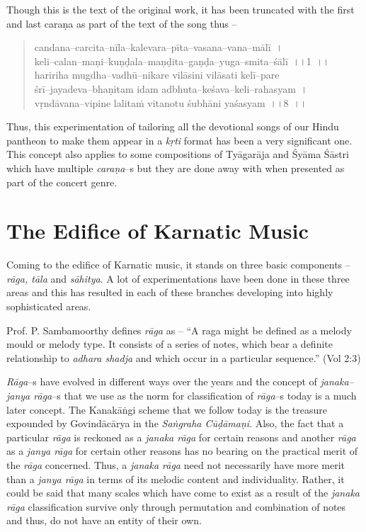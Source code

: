 Though this is the text of the original work, it has been truncated with the first and last caraṇa as part of the text of the song thus –

\begin{verse}
candana–carcita–nīla–kalevara–pīta–vasana–vana–mālī~।\\ keli–calan–maṇi–kuṇḍala–maṇḍita–gaṇḍa–yuga–smita–śālī~।।1~।।\\ haririha mugdha–vadhū–nikare vilāsini vilāsati kelī–pare\\ śrī–jayadeva–bhaṇitam idam adbhuta–keśava–keli–rahasyam~।\\ vṛndāvana–vipine lalitaṁ vitanotu śubhāni yaśasyam~।।8~।।
\end{verse}

Thus, this experimentation of tailoring all the devotional songs of our Hindu pantheon to make them appear in a \textit{kṛti} format has been a very significant one. This concept also applies to some compositions of Tyāgarāja and Śyāma Śāstri which have multiple \textit{caraṇa}–s but they are done away with when presented as part of the concert genre.


\section*{The Edifice of Karnatic Music}

Coming to the edifice of Karnatic music, it stands on three basic components – \textit{rāga, tāla} and \textit{sāhitya}. A lot of experimentations have been done in these three areas and this has resulted in each of these branches developing into highly sophisticated areas.

Prof. P. Sambamoorthy defines \textit{rāga} as – “A raga might be defined as a melody mould or melody type. It consists of a series of notes, which bear a definite relationship to \textit{adhara shadja} and which occur in a particular sequence.” (Vol 2:3)

\textit{Rāga}–s have evolved in different ways over the years and the concept of \textit{janaka–janya rāga}–s that we use as the norm for classification of \textit{rāga}–s today is a much later concept. The Kanakāṅgi scheme that we follow today is the treasure expounded by Govindācārya in the \textit{Saṅgraha Cūḍāmaṇi}. Also, the fact that a particular \textit{rāga} is reckoned as a \textit{janaka rāga} for certain reasons and another \textit{rāga} as a \textit{janya rāga} for certain other reasons has no bearing on the practical merit of the \textit{rāga} concerned. Thus, a \textit{janaka rāga} need not necessarily have more merit than a \textit{janya rāga} in terms of its melodic content and individuality. Rather, it could be said that many scales which have come to exist as a result of the \textit{janaka rāga} classification survive only through permutation and combination of notes and thus, do not have an entity of their own.


